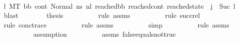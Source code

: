 \begin{isabellebody}
\ \ \ \ \ \ \ \ \isamarkupfalse%
\ {\isacartoucheopen}{\isasymexists}l{}{\isachardot}{\kern0pt}\ {\isacharparenleft}{\kern0pt}M{\isacharcomma}{\kern0pt}{\isasymLambda}{\isacharcomma}{\kern0pt}{\isasymGamma}{\isacharcomma}{\kern0pt}{\isasymOmega}{\isacharcomma}{\kern0pt}T\ {\isasymturnstile}{\isacharparenleft}{\kern0pt}bb{\isacharcomma}{\kern0pt}\ cont{}{\isacharcomma}{\kern0pt}\ Normal\ ns{}{\isacharprime}{\kern0pt}{\isacharprime}{\kern0pt}{\isacharparenright}{\kern0pt}\ {\isacharminus}{\kern0pt}n{\isasymlongrightarrow}{\isacharcircum}{\kern0pt}l{}\ {\isacharparenleft}{\kern0pt}reached{\isacharunderscore}{\kern0pt}bb{\isacharcomma}{\kern0pt}\ reached{\isacharunderscore}{\kern0pt}cont{\isacharcomma}{\kern0pt}\ reached{\isacharunderscore}{\kern0pt}state{\isacharparenright}{\kern0pt}{\isacharparenright}{\kern0pt}\ {\isasymand}\ j{\isacharprime}{\kern0pt}\ {\isacharequal}{\kern0pt}\ Suc\ l{}{\isacartoucheclose}\ \isamarkupfalse%
\ blast\isanewline
\ \ \ \ \ \ \isamarkupfalse%
\ {\isacharquery}{\kern0pt}thesis\isanewline
\ \ \ \ \ \ \ \ \isamarkupfalse%
\ {\isacharparenleft}{\kern0pt}rule\ assms{\isacharparenleft}{\kern0pt}{}{\isacharparenright}{\kern0pt}{\isacharparenright}{\kern0pt}\isanewline
\ \ \ \ \ \ \ \ \isamarkupfalse%
\ {\isacharparenleft}{\kern0pt}rule\ succ{\isacharunderscore}{\kern0pt}rel{\isacharparenright}{\kern0pt}\isanewline
\ \ \ \ \ \ \ \ \isamarkupfalse%
\ {\isacharparenleft}{\kern0pt}rule\ conc{\isacharunderscore}{\kern0pt}trace{\isacharparenright}{\kern0pt}\isanewline
\ \ \ \ \ \ \ \ \isamarkupfalse%
\ {\isacharparenleft}{\kern0pt}rule\ assms{\isacharparenleft}{\kern0pt}{}{\isacharparenright}{\kern0pt}{\isacharparenright}{\kern0pt}\isanewline
\ \ \ \ \ \ \ \ \isamarkupfalse%
\ {\isacharparenleft}{\kern0pt}simp{\isacharparenright}{\kern0pt}\isanewline
\ \ \ \ \ \ \ \ \isamarkupfalse%
\ {\isacharparenleft}{\kern0pt}rule\ assms{\isacharparenleft}{\kern0pt}{}{\isacharparenright}{\kern0pt}{\isacharparenright}{\kern0pt}\isanewline
\ \ \ \ \ \ \ \ \isamarkupfalse%
\ assumption{\isacharplus}{\kern0pt}\isanewline
\ \ \ \ \ \ \ \ \isamarkupfalse%
\ assms{\isacharparenleft}{\kern0pt}{}{\isacharparenright}{\kern0pt}\ false{\isacharunderscore}{\kern0pt}equals{\isacharunderscore}{\kern0pt}not{\isacharunderscore}{\kern0pt}true\ \isanewline

\end{isabellebody}

